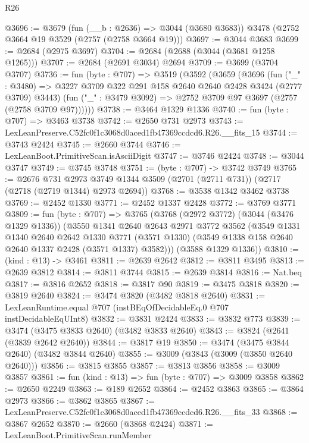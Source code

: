 \begin{lexlean}{R26}
\begin{coremodule}
@3696 := @3679
    (fun (__b : @2636) => @3044 (@3680 @3683))
    @3478
    (@2752 @3664 @19 @3529 (@2757 (@2758 @3664 @19)))
@3697 := @3044 @3683
@3699 := @2684 (@2975 @3697)
@3704 := @2684 (@2688 (@3044 (@3681 @1258 @1265)))
@3707 := @2684 (@2691 @3034) @2694
@3709 := @3699 (@3704 @3707)
@3736 := fun (byte : @707) =>
  @3519
    (@3592
      (@3659
        (@3696
          (fun ("_" : @3480) =>
          @3227 @3709 @322 @291 @158 @2640 @2640 @2428 @3424 (@2777 @3709) @3443)
          (fun ("_" : @3479 @3092) => @2752 @3709 @97 @3697 (@2757 (@2758 @3709 @97))))))
@3738 := @3464 @1329 @1336
@3740 := fun (byte : @707) => @3463 @3738
@3742 := @2650 @731 @2973
@3743 := LexLeanPreserve.C52fc0f1c3068d0aced1fb47369ccdcd6.R26.__fits_15
@3744 := @3743 @2424
@3745 := @2660 @3744
@3746 := LexLeanBoot.PrimitiveScan.isAsciiDigit
@3747 := @3746 @2424
@3748 := @3044 @3747
@3749 := @3745 @3748
@3751 := (byte : @707) -> @3742 @3749
@3765 := @2676
    @731
    @2973
    @3749
    @1344
    @3509
    (@2701 (@2711 @731))
    (@2717 (@2718 (@2719 @1344) @2973 @2694))
@3768 := @3538 @1342 @3462 @3738
@3769 := @2452 @1330
@3771 := @2452 @1337 @2428
@3772 := @3769 @3771
@3809 := fun (byte : @707) =>
  @3765
    (@3768
      (@2972 @3772)
      (@3044 (@3476 @1329 @1336))
      (@3550
        @1341
        @2640
        @2643
        @2971
        @3772
        @3562
        (@3549
          @1331
          @1340
          @2640
          @2642
          @1330
          @3771
          (@3571 @1330)
          (@3549 @1338 @158 @2640 @2640 @1337 @2428 (@3571 @1337) @3582)))
      (@3588 @1329 @1336))
@3810 := (kind : @13) -> @3461
@3811 := @2639 @2642
@3812 := @3811 @3495
@3813 := @2639 @3812
@3814 := @3811 @3744
@3815 := @2639 @3814
@3816 := Nat.beq
@3817 := @3816 @2652
@3818 := @3817 @90
@3819 := @3475 @3818
@3820 := @3819 @2640
@3824 := @3474 @3820 (@3482 @3818 @2640)
@3831 := LexLeanRuntime.equal @707 (instBEqOfDecidableEq.{0} @707 instDecidableEqUInt8)
@3832 := @3831 @2424
@3833 := @3832 @773
@3839 := @3474 (@3475 @3833 @2640) (@3482 @3833 @2640)
@3843 := @3824 (@2641 (@3839 @2642 @2640))
@3844 := @3817 @19
@3850 := @3474 (@3475 @3844 @2640) (@3482 @3844 @2640)
@3855 := @3009 (@3843 (@3009 (@3850 @2640 @2640)))
@3856 := @3815 @3855
@3857 := @3813 @3856
@3858 := @3009 @3857
@3861 := fun (kind : @13) => fun (byte : @707) => @3009 @3858
@3862 := @2650 @2249
@3863 := @189 @2652
@3864 := @2452 @3863
@3865 := @3864 @2973
@3866 := @3862 @3865
@3867 := LexLeanPreserve.C52fc0f1c3068d0aced1fb47369ccdcd6.R26.__fits_33
@3868 := @3867 @2652
@3870 := @2660 (@3868 @2424)
@3871 := LexLeanBoot.PrimitiveScan.runMember

\end{coremodule}
\end{lexlean}
